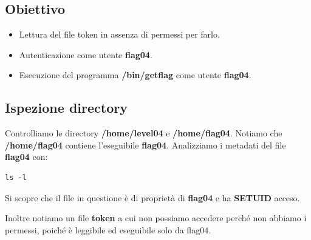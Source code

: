 \subsection{Obiettivo}
\begin{itemize}
    \item Lettura del file token in assenza di permessi per farlo.
    \item Autenticazione come utente \textbf{flag04}.
    \item Esecuzione del programma \textbf{/bin/getflag} come utente \textbf{flag04}.
\end{itemize}

\subsection{Ispezione directory}
Controlliamo le directory \textbf{/home/level04} e \textbf{/home/flag04}. Notiamo che \textbf{/home/flag04} contiene l’eseguibile \textbf{flag04}.
Analizziamo i metadati del file \textbf{flag04} con: 
\begin{lstlisting}[style=bashstyle]
    ls -l
\end{lstlisting}
Si scopre che il file in questione è di proprietà di \textbf{flag04} e ha \textbf{SETUID} acceso.

Inoltre notiamo un file \textbf{token} a cui non possiamo accedere perché non abbiamo i permessi, poiché è leggibile ed eseguibile solo da flag04.


